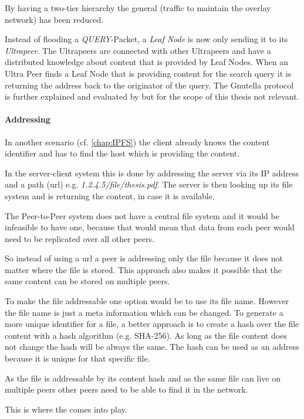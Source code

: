 By having a two-tier hierarchy the general  (traffic to maintain the overlay network) has been reduced.

Instead of flooding a \textit{QUERY}-Packet, a \textit{Leaf Node} is now only sending it to its \textit{Ultrapeer}. The Ultrapeers are connected with other Ultrapeers and have a distributed knowledge about content that is provided by Leaf Nodes. When an Ultra Peer finds a Leaf Node that is providing content for the search query it is returning the address back to the originator of the query. The Gnutella protocol is further explained and evaluated by \citet{gnutellaAnalysis} but for the scope of this thesis not relevant.

\paragraph{Addressing}
In another scenario (cf. \vref{chap:IPFS}) the client already knows the content identifier and has to find the host which is providing the content.

In the server-client system this is done by addressing the server via its IP address and a path (\gls{url}) e.g. \textit{1.2.4.5/file/thesis.pdf}. The server is then looking up its file system and is returning the content, in case it is available.

The Peer-to-Peer system does not have a central file system and it would be infeasible to have one, because that would mean that data from each peer would need to be replicated over all other peers.

So instead of using a \gls{url} a peer is addressing only the file because it does not matter where the file is stored. This approach also makes it possible that the same content can be stored on multiple peers.

To make the file addressable one option would be to use its file name. However the file name is just a meta information which can be changed. To generate a more unique identifier for a file, a better approach is to create a hash over the file content with a hash algorithm (e.g. SHA-256). As long as the file content does not change the hash will be always the same. The hash can be used as an address because it is unique for that specific file.

As the file is addressable by its content hash and as the same file can live on multiple peers other peers need to be able to find it in the network.

This is where the  comes into play.

